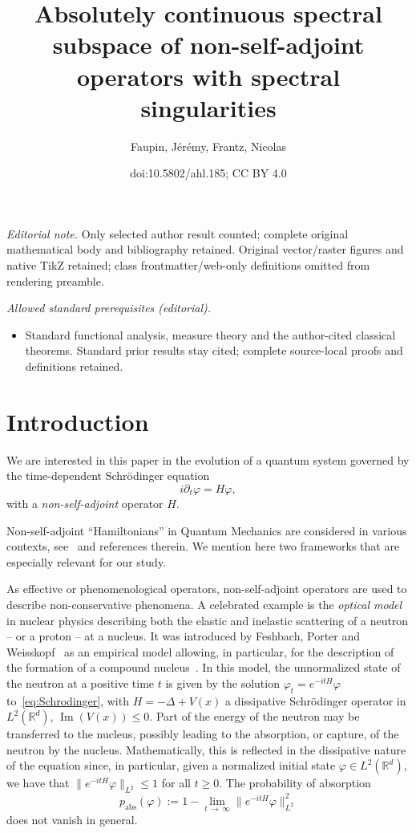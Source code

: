 \documentclass[10pt]{amsart}
\title{Absolutely continuous spectral subspace of non-self-adjoint operators with spectral singularities}
\author{Faupin, Jérémy, Frantz, Nicolas}
\date{doi:10.5802/ahl.185; CC BY 4.0}
\theoremstyle{definition}\newtheorem{defi}[theo]{Definition}\newtheorem{rema}[theo]{Remark}\newtheorem{exam}[theo]{Example}\newtheorem{exem}[theo]{Example}\newtheorem{nota}[theo]{Notation}
\newcommand{\R}{\mathbb{R}}
\newcommand{\abs}{\mathrm{abs}}
\DeclareMathOperator{\im}{Im}
\begin{document}
\maketitle
\noindent\textit{Editorial note.} Only selected author result counted; complete original mathematical body and bibliography retained. Original vector/raster figures and native TikZ retained; class frontmatter/web-only definitions omitted from rendering preamble.\par\medskip
\noindent\textit{Allowed standard prerequisites (editorial).}\begin{itemize}
\item Standard functional analysis, measure theory and the author-cited classical theorems. Standard prior results stay cited; complete source-local proofs and definitions retained.
\end{itemize}\medskip
\setcounter{tocdepth}{2}
\tableofcontents


\section{Introduction}

We are interested in this paper in the evolution of a quantum system governed by the time-dependent Schr\"odinger equation
\begin{equation}\label{eq:Schrodinger}
i\partial_t \varphi = H \varphi, 
\end{equation}
with a \emph{non-self-adjoint} operator $H$.

Non-self-adjoint ``Hamiltonians'' in Quantum Mechanics are considered in various contexts, see~\cite{Ba15_01,Kr17_01} and references therein. We mention here two frameworks that are especially relevant for our study.

As effective or phenomenological operators, non-self-adjoint operators are used to describe non-conservative phenomena. A celebrated example is the \emph{optical model} in nuclear physics describing both the elastic and inelastic scattering of a neutron -- or a proton -- at a nucleus. It was introduced by Feshbach, Porter and Weisskopf~\cite{FePoWe54_01} as an empirical model allowing, in particular, for the description of the formation of a compound nucleus~\cite{Bo36_01}. In this model, the unnormalized state of the neutron at a positive time $t$ is given by the solution $\varphi_t=e^{-itH}\varphi$ to~\eqref{eq:Schrodinger}, with $H = - \Delta + V(x)$ a dissipative Schr\"odinger operator in $L^2(\R^d)$, $\im(V(x))\le0$. Part of the energy of the neutron may be transferred to the nucleus, possibly leading to the absorption, or capture, of the neutron by the nucleus. Mathematically, this is reflected in the dissipative nature of the equation since, in particular, given a normalized initial state $\varphi\in L^2(\R^d)$, we have that $\|e^{-itH}\varphi\|_{L^2}\le 1$ for all $t\ge0$. The probability of absorption
\begin{equation*}
p_{\abs}(\varphi):=1-\lim_{t\,\to\,\infty}\big\|e^{-itH}\varphi\big\|_{L^2}^2
\end{equation*}
does not vanish in general.
\end{document}
